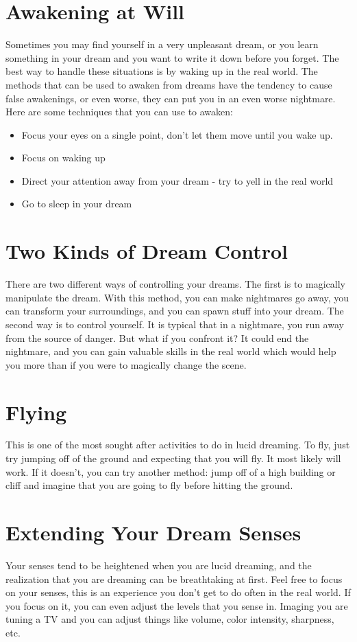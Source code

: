 \documentclass{book}
\begin{document}
\section{Awakening at Will}
Sometimes you may find yourself in a very unpleasant dream, or you learn something in your dream and you want to write it down before you forget. The best way to handle these situations is by waking up in the real world. The methods that can be used to awaken from dreams have the tendency to cause false awakenings, or even worse, they can put you in an even worse nightmare. Here are some techniques that you can use to awaken:

\begin {itemize}
	\item Focus your eyes on a single point, don't let them move until you wake up.
	\item Focus on waking up
	\item Direct your attention away from your dream - try to yell in the real world
	\item Go to sleep in your dream
\end {itemize}

\section{Two Kinds of Dream Control}
There are two different ways of controlling your dreams. The first is to magically manipulate the dream. With this method, you can make nightmares go away, you can transform your surroundings, and you can spawn stuff into your dream. The second way is to control yourself. It is typical that in a nightmare, you run away from the source of danger. But what if you confront it? It could end the nightmare, and you can gain valuable skills in the real world which would help you more than if you were to magically change the scene. 

\section{Flying}
This is one of the most sought after activities to do in lucid dreaming. To fly, just try jumping off of the ground and expecting that you will fly. It most likely will work. If it doesn't, you can try another method: jump off of a high building or cliff and imagine that you are going to fly before hitting the ground.

\section{Extending Your Dream Senses}
Your senses tend to be heightened when you are lucid dreaming, and the realization that you are dreaming can be breathtaking at first. Feel free to focus on your senses, this is an experience you don't get to do often in the real world. If you focus on it, you can even adjust the levels that you sense in. Imaging you are tuning a TV and you can adjust things like volume, color intensity, sharpness, etc.
\end{document}
